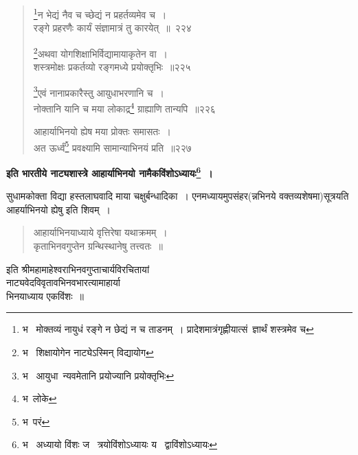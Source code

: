 \documentclass[11pt, openany]{book}
\begin{document}
\newpage

\begin{quote}
{\na \renewcommand{\thefootnote}{1}\footnote{भ \textendash\ मोक्तव्यं नायुधं रङ्गे न छेद्यं न च ताडनम्~। प्रादेशमात्रंगृह्णीयात्सं\textendash\ ज्ञार्थं शस्त्रमेव च}न भेद्यं नैव च च्छेद्यं न प्रहर्तव्यमेव च~।\\
रङ्गे प्रहरणैः कार्यं संज्ञामात्रं तु कारयेत्~॥~२२४

\renewcommand{\thefootnote}{2}\footnote{भ \textendash\ शिक्षायोगेन नाट्येऽस्मिन् विद्यायोग}अथवा योगशिक्षाभिर्विद्यामायाकृतेन वा~।\\
शस्त्रमोक्षः प्रकर्तव्यो रङ्गमध्ये प्रयोक्तृभिः~॥२२५ 

\renewcommand{\thefootnote}{3}\footnote{भ \textendash\ आयुधा\textendash\ न्यवमेतानि प्रयोज्यानि प्रयोक्तृभिः}एवं नानाप्रकारैस्तु आयुधाभरणानि च~। \\
नोक्तानि यानि च मया लोकाद्र\renewcommand{\thefootnote}{4}\footnote{भ\textendash\ लोके} ग्राह्याणि तान्यपि~॥२२६ 

आहार्याभिनयो ह्येष मया प्रोक्तः समासतः~। \\
अत ऊर्ध्वं\renewcommand{\thefootnote}{5}\footnote{भ\textendash\ परं} प्रवक्ष्यामि सामान्याभिनयं प्रति~॥२२७ }
\end{quote}

\begin{center}
\textbf{इति भारतीये नाट्यशास्त्रे आहार्याभिनयो नामैकविंशोऽध्यायः\renewcommand{\thefootnote}{6}\footnote{भ \textendash\ अध्यायो विंशः ज \textendash\ त्रयोविंशोऽध्यायः य \textendash\ द्वाविंशोऽध्यायः}~।}
\end{center}

सुधामकोक्ता विद्या हस्तलाघवादि माया चक्षुर्बन्धादिका~। एनमध्यायमुपसंहर(न्नभिनये वक्तव्यशेषमा)सूत्रयति आहर्याभिनयो ह्येषु इति शिवम्~। 

\begin{quote}
{\qt आहार्याभिनयाध्याये वृत्तिरेषा यथाक्रमम्~। \\
कृताभिनवगुप्तेन ग्रन्थिस्थानेषु तत्त्वतः~॥}
\end{quote}

\begin{center}
इति श्रीमहामाहेश्वराभिनवगुप्ताचार्यविरचितायां \\
नाट्यवेदविवृतावभिनवभारत्यामाहार्या\textendash\ \\
भिनयाध्याय एकविंशः~॥
\end{center}


\newpage
\lfoot{}
\thispagestyle{empty}
\end{document}
